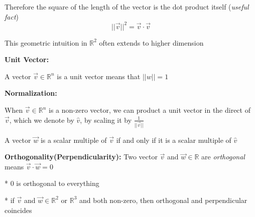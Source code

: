 \documentclass{article}
\begin{document}
Therefore the square of the length of the vector is the dot product itself
(\emph{useful fact})
\[
    ||\vec{v}||^2 =\vec{v} \cdot \vec{v}
\]

This geometric intuition in $\mathbb{R}^2 $ often extends to higher dimension

\medskip

\textbf{Unit Vector:}

A vector $\vec{v} \in \mathbb{R}^n $ is a unit vector means that $||w|| = 1$ 

\medskip

\textbf{Normalization:}

When $\vec{v} \in \mathbb{R}^n $ is a non-zero vector,
we can product a unit vector in  the direct of $\vec{v}$,
which we denote by \textbf{$\hat{v}$}, by scaling it by $\frac{1}{||\vec{v}||}$ 

\medskip
A vector $\vec{w}$ is a scalar multiple of $\vec{v}$ if and only if 
it is a scalar multiple of $\hat{v}$

\medskip
\textbf{Orthogonality(Perpendicularity):}
Two vector $\vec{v} $ and $\vec{w} \in \mathbb{R} $ are \emph{orthogonal} means
$\vec{v} \cdot \vec{w} = 0$

* 0 is orthogonal to everything

* if $\vec{v} $ and $\vec{w} \in \mathbb{R}^2$ or $\mathbb{R}^3$
and both non-zero, then orthogonal and perpendicular coincides
\end{document}
